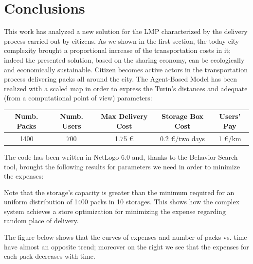 \documentclass[11pt,a4paper]{article}
\begin{document}
\section{Conclusions}
This work has analyzed a new solution for the LMP characterized by the delivery process carried out by citizens. As we shown in the first section, the today city complexity brought a proportional increase of the transportation costs in it; indeed the presented solution, based on the sharing economy, can be ecologically and economically sustainable. Citizen becomes active actors in the transportation process delivering packs all around the city. The Agent-Based Model has been realized with a scaled map in order to express the Turin's distances and adequate (from a computational point of view) parameters:
\begin{center}
  \begin{tabular}{c|c|c|c|c}
    \hline
    Numb. Packs & Numb. Users & Max Delivery Cost & Storage Box Cost & Users' Pay \\
    \hline
    \hline
    1400 & 700 & 1.75 \euro{} & 0.2 \euro{}/two days & 1 \euro{}/km \\
    \hline
  \end{tabular}
\end{center}
The code has been written in NetLogo 6.0 and, thanks to the Behavior Search tool, brought the following results for parameters we need in order to minimize the expenses:
\begin{center}
\end{center}
Note that the storage's capacity is greater than the minimum required for an uniform distribution of 1400 packs in 10 storages. This shows how the complex system achieves a store optimization for minimizing the expense regarding random place of delivery.
\bigskip

The figure below shows that the curves of expenses and number of packs vs. time have almost an opposite trend; moreover on the right we see that the expenses for each pack decreases with time.
\end{document}
